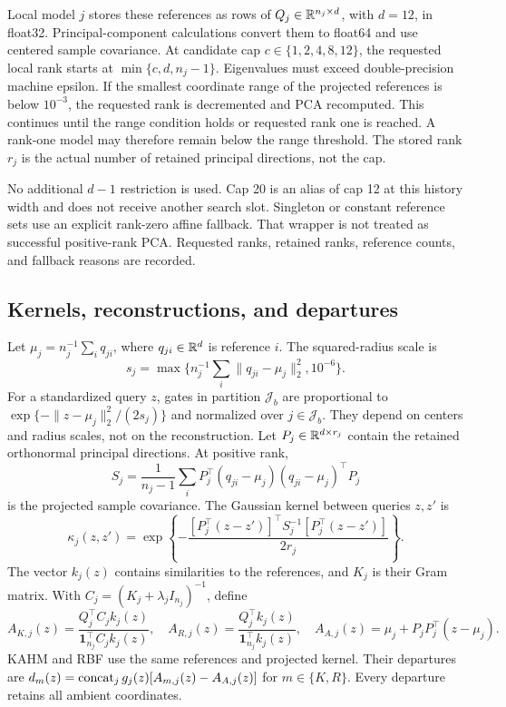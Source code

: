 Local model $j$ stores these references as rows of $Q_j\in\mathbb R^{n_j\times d}$, with $d=12$, in float32. Principal-component calculations convert them to float64 and use centered sample covariance. At candidate cap $c\in\{1,2,4,8,12\}$, the requested local rank starts at $\min\{c,d,n_j-1\}$. Eigenvalues must exceed double-precision machine epsilon. If the smallest coordinate range of the projected references is below $10^{-3}$, the requested rank is decremented and PCA recomputed. This continues until the range condition holds or requested rank one is reached. A rank-one model may therefore remain below the range threshold. The stored rank $r_j$ is the actual number of retained principal directions, not the cap.

No additional $d-1$ restriction is used. Cap 20 is an alias of cap 12 at this history width and does not receive another search slot. Singleton or constant reference sets use an explicit rank-zero affine fallback. That wrapper is not treated as successful positive-rank PCA. Requested ranks, retained ranks, reference counts, and fallback reasons are recorded.

\subsection{Kernels, reconstructions, and departures}
Let $\mu_j=n_j^{-1}\sum_i q_{ji}$, where $q_{ji}\in\mathbb R^d$ is reference $i$. The squared-radius scale is
\[
 s_j=\max\{n_j^{-1}\sum_i\|q_{ji}-\mu_j\|_2^2,10^{-6}\}.
\]
For a standardized query $z$, gates in partition $\mathcal J_b$ are proportional to $\exp\{-\|z-\mu_j\|_2^2/(2s_j)\}$ and normalized over $j\in\mathcal J_b$. They depend on centers and radius scales, not on the reconstruction. Let $P_j\in\mathbb R^{d\times r_j}$ contain the retained orthonormal principal directions. At positive rank,
\[
 S_j=\frac1{n_j-1}\sum_i P_j^\top(q_{ji}-\mu_j)(q_{ji}-\mu_j)^\top P_j
\]
is the projected sample covariance. The Gaussian kernel between queries $z,z'$ is
\[
 \kappa_j(z,z')=\exp\left\{-\frac{[P_j^\top(z-z')]^\top S_j^{-1}[P_j^\top(z-z')]}{2r_j}\right\}.
\]
The vector $k_j(z)$ contains similarities to the references, and $K_j$ is their Gram matrix. With $C_j=(K_j+\lambda_j I_{n_j})^{-1}$, define
\[
 A_{K,j}(z)=\frac{Q_j^\top C_jk_j(z)}{\mathbf1_{n_j}^\top C_jk_j(z)},\quad
 A_{R,j}(z)=\frac{Q_j^\top k_j(z)}{\mathbf1_{n_j}^\top k_j(z)},\quad
 A_{A,j}(z)=\mu_j+P_jP_j^\top(z-\mu_j).
\]
KAHM and RBF use the same references and projected kernel. Their departures are $d_m(z)=\operatorname{concat}_j g_j(z)[A_{m,j}(z)-A_{A,j}(z)]$ for $m\in\{K,R\}$. Every departure retains all ambient coordinates.

